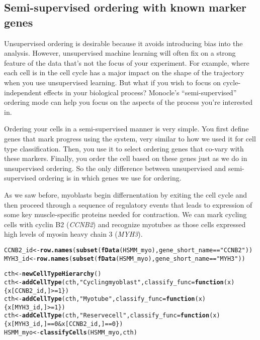 \documentclass[10pt,oneside]{article}\usepackage[]{graphicx}\usepackage[]{color}
\makeatletter
\newcommand{\hlnum}[1]{\textcolor[rgb]{0.686,0.059,0.569}{#1}}%
\newcommand{\hlstr}[1]{\textcolor[rgb]{0.192,0.494,0.8}{#1}}%
\newcommand{\hlopt}[1]{\textcolor[rgb]{0,0,0}{#1}}%
\newcommand{\hlstd}[1]{\textcolor[rgb]{0.345,0.345,0.345}{#1}}%
\newcommand{\hlkwa}[1]{\textcolor[rgb]{0.161,0.373,0.58}{\textbf{#1}}}%
\newcommand{\hlkwb}[1]{\textcolor[rgb]{0.69,0.353,0.396}{#1}}%
\newcommand{\hlkwc}[1]{\textcolor[rgb]{0.333,0.667,0.333}{#1}}%
\newcommand{\hlkwd}[1]{\textcolor[rgb]{0.737,0.353,0.396}{\textbf{#1}}}%
\newenvironment{kframe}{%
 \def\at@end@of@kframe{}%
 \ifinner\ifhmode%
  \def\at@end@of@kframe{\end{minipage}}%
  \begin{minipage}{\columnwidth}%
 \fi\fi%
 \def\FrameCommand##1{\hskip\@totalleftmargin \hskip-\fboxsep
 \colorbox{shadecolor}{##1}\hskip-\fboxsep
     \hskip-\linewidth \hskip-\@totalleftmargin \hskip\columnwidth}%
 \MakeFramed {\advance\hsize-\width
   \@totalleftmargin\z@ \linewidth\hsize
   \@setminipage}}%
 {\par\unskip\endMakeFramed%
 \at@end@of@kframe}
\newenvironment{knitrout}{}{} %
\makeatother
\begin{document}
\subsection{Semi-supervised ordering with known marker genes}

Unsupervised ordering is desirable because it avoids introducing bias into the analysis. However, unsupervised machine learning will often fix on a strong feature of the data that's not the focus of your experiment. For example, where each cell is in the cell cycle has a major impact on the shape of the trajectory when you use unsupervised learning. But what if you wish to focus on cycle-independent effects in your biological process? Monocle's ``semi-supervised'' ordering mode can help you focus on the aspects of the process you're interested in.

Ordering your cells in a semi-supervised manner is very simple. You first define genes that mark progress using the  system, very similar to how we used it for cell type classification. Then, you use it to select ordering genes that co-vary with these markers. Finally, you order the cell based on these genes just as we do in unsupervised ordering. So the only difference between unsupervised and semi-supervised ordering is in which genes we use for ordering.

As we saw before, myoblasts begin differnentation by exiting the cell cycle and then proceed through a sequence of regulatory events that leads to expression of some key muscle-specific proteins needed for contraction. We can mark cycling cells with cyclin B2 (\emph{CCNB2}) and recognize myotubes as those cells expressed high levels of myosin heavy chain 3 (\emph{MYH3}).
\begin{knitrout}
\color{fgcolor}\begin{kframe}
\begin{alltt}
\hlstd{CCNB2_id} \hlkwb{<-} \hlkwd{row.names}\hlstd{(}\hlkwd{subset}\hlstd{(}\hlkwd{fData}\hlstd{(HSMM_myo), gene_short_name} \hlopt{==} \hlstr{"CCNB2"}\hlstd{))}
\hlstd{MYH3_id} \hlkwb{<-} \hlkwd{row.names}\hlstd{(}\hlkwd{subset}\hlstd{(}\hlkwd{fData}\hlstd{(HSMM_myo), gene_short_name} \hlopt{==} \hlstr{"MYH3"}\hlstd{))}

\hlstd{cth} \hlkwb{<-} \hlkwd{newCellTypeHierarchy}\hlstd{()}
\hlstd{cth} \hlkwb{<-} \hlkwd{addCellType}\hlstd{(cth,} \hlstr{"Cycling myoblast"}\hlstd{,} \hlkwc{classify_func}\hlstd{=}\hlkwa{function}\hlstd{(}\hlkwc{x}\hlstd{) \{x[CCNB2_id,]} \hlopt{>=} \hlnum{1}\hlstd{\})}
\hlstd{cth} \hlkwb{<-} \hlkwd{addCellType}\hlstd{(cth,} \hlstr{"Myotube"}\hlstd{,} \hlkwc{classify_func}\hlstd{=}\hlkwa{function}\hlstd{(}\hlkwc{x}\hlstd{) \{x[MYH3_id,]} \hlopt{>=}\hlnum{1}\hlstd{\})}
\hlstd{cth} \hlkwb{<-} \hlkwd{addCellType}\hlstd{(cth,} \hlstr{"Reserve cell"}\hlstd{,} \hlkwc{classify_func}\hlstd{=}\hlkwa{function}\hlstd{(}\hlkwc{x}\hlstd{) \{x[MYH3_id,]} \hlopt{==} \hlnum{0} \hlopt{&} \hlstd{x[CCNB2_id,]} \hlopt{==} \hlnum{0}\hlstd{\})}
\hlstd{HSMM_myo} \hlkwb{<-} \hlkwd{classifyCells}\hlstd{(HSMM_myo, cth)}
\end{alltt}
\end{kframe}
\end{knitrout}
\end{document}
